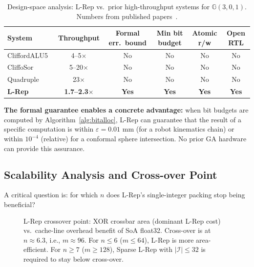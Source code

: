 \documentclass[11pt,a4paper]{article}
\theoremstyle{definition}
\theoremstyle{plain}
\theoremstyle{remark}
\newcommand{\GA}{\mathbb{G}}
\begin{document}
\begin{table}[h]
\centering
\caption{Design-space analysis: L-Rep vs.\ prior high-throughput systems
for $\GA(3,0,1)$.
Numbers from published papers~\cite{cliffordalu5,cliffosor}.}
\label{tab:design-space}
\begin{tabular}{lccccc}
\toprule
System & Throughput & Formal err.\ bound & Min bit budget & Atomic r/w & Open RTL \\
\midrule
CliffordALU5~\cite{cliffordalu5} & 4--5$\times$ & No & No & No & No \\
CliffoSor~\cite{cliffosor} & 5--20$\times$ & No & No & No & No \\
Quadruple~\cite{quadrupleGA} & 23$\times$ & No & No & No & No \\
\textbf{L-Rep} & \textbf{1.7--2.3}$\times$ & \textbf{Yes} & \textbf{Yes} & \textbf{Yes} & \textbf{Yes} \\
\bottomrule
\end{tabular}
\end{table}

\textbf{The formal guarantee enables a concrete advantage:}
when bit budgets are computed by Algorithm~\ref{alg:bitalloc},
L-Rep can guarantee that the result of a specific computation is
within $\varepsilon = 0.01$ mm (for a robot kinematics chain) or
within $10^{-4}$ (relative) for a conformal sphere intersection.
No prior GA hardware can provide this assurance.

\subsection{Scalability Analysis and Cross-over Point}

A critical question is: for which $n$ does L-Rep's single-integer packing
stop being beneficial?

\begin{figure}[h]
\centering
{}
\caption{L-Rep crossover point: XOR crossbar area (dominant L-Rep cost)
vs.\ cache-line overhead benefit of SoA float32.
Cross-over is at $n \approx 6.3$, i.e., $m \approx 96$.
For $n \le 6$ ($m \le 64$), L-Rep is more area-efficient.
For $n \ge 7$ ($m \ge 128$), Sparse L-Rep with
$|\mathcal{I}| \le 32$ is required to stay below cross-over.}
\label{fig:crossover}
\end{figure}
\end{document}
